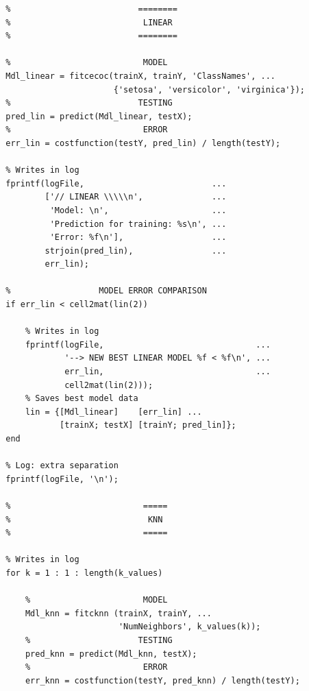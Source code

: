 \documentclass[11pt]{article}
\begin{document}
\begin{listing}
\begin{verbatim}
        %                          ========
        %                           LINEAR
        %                          ========
        
        %                           MODEL
        Mdl_linear = fitcecoc(trainX, trainY, 'ClassNames', ...
                              {'setosa', 'versicolor', 'virginica'});
        %                          TESTING
        pred_lin = predict(Mdl_linear, testX);
        %                           ERROR
        err_lin = costfunction(testY, pred_lin) / length(testY);
        
        % Writes in log
        fprintf(logFile,                          ...
                ['// LINEAR \\\\\n',              ...
                 'Model: \n',                     ...
                 'Prediction for training: %s\n', ...
                 'Error: %f\n'],                  ...
                strjoin(pred_lin),                ...
                err_lin);
        
        %                  MODEL ERROR COMPARISON
        if err_lin < cell2mat(lin(2))
            
            % Writes in log
            fprintf(logFile,                               ...
                    '--> NEW BEST LINEAR MODEL %f < %f\n', ...
                    err_lin,                               ...
                    cell2mat(lin(2)));
            % Saves best model data
            lin = {[Mdl_linear]    [err_lin] ...
                   [trainX; testX] [trainY; pred_lin]};
        end
        
        % Log: extra separation
        fprintf(logFile, '\n');
        
        %                           =====
        %                            KNN
        %                           =====
        
        % Writes in log 
        for k = 1 : 1 : length(k_values)
            
            %                       MODEL
            Mdl_knn = fitcknn (trainX, trainY, ...
                               'NumNeighbors', k_values(k));
            %                      TESTING
            pred_knn = predict(Mdl_knn, testX);
            %                       ERROR
            err_knn = costfunction(testY, pred_knn) / length(testY);
            

\end{verbatim}
\end{listing}
\end{document}
